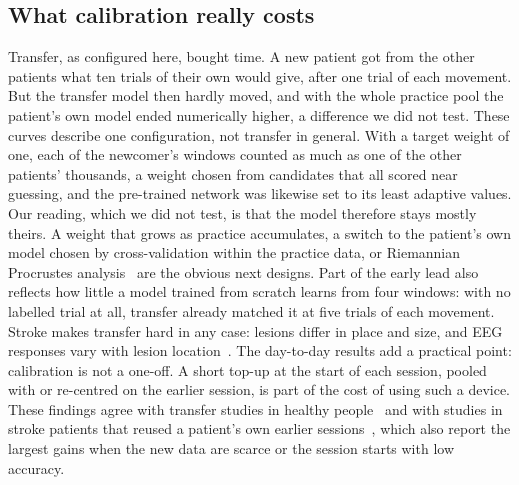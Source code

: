 \subsection{What calibration really costs}
Transfer, as configured here, bought time. A new patient got from the other patients
what ten trials of their own would give, after one trial of each movement. But the
transfer model then hardly moved, and with the whole practice pool the patient's own model
ended numerically higher, a difference we did not test. These curves describe one
configuration, not transfer in general. With a target weight of one, each of the
newcomer's windows counted as much as one of the other patients' thousands, a weight
chosen from candidates that all scored near guessing, and the pre-trained network was
likewise set to its least adaptive values. Our reading, which we did not test, is that
the model therefore stays mostly theirs. A weight that grows as practice accumulates, a
switch to the patient's own model chosen by cross-validation within the practice data,
or Riemannian Procrustes analysis~\cite{rodrigues2019} are the obvious next designs. Part
of the early lead also reflects how little a model trained from scratch learns from four
windows: with no labelled trial at all, transfer already matched it at five trials of
each movement. Stroke makes transfer hard in any case: lesions differ in place and size,
and EEG responses vary with lesion location~\cite{park2016}. The day-to-day results add a
practical point: calibration is not a one-off. A short top-up at the start of each
session, pooled with or re-centred on the earlier session, is part of the cost of using
such a device. These findings agree with transfer studies in healthy
people~\cite{he2020,zanini2018,wu2022review} and with studies in stroke patients that
reused a patient's own earlier sessions~\cite{giles2022,cao2021}, which also report the
largest gains when the new data are scarce or the session starts with low accuracy.

